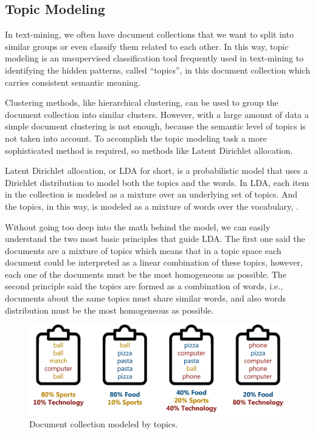 	\subsection{Topic Modeling}
	
	In text-mining, we often have document collections that we want to split into similar groups or even classify them related to each other. In this way, topic modeling is an unsupervised classification tool frequently used in text-mining to identifying the hidden patterns, called ``topics'', in this document collection which carries consistent semantic meaning.
	
	Clustering methods, like hierarchical clustering, can be used to group the document collection into similar clusters. However, with a large amount of data a simple document clustering is not enough, because the semantic level of topics is not taken into account. To accomplish the topic modeling task a more sophisticated method is required, so methods like Latent Dirichlet allocation.
	
	Latent Dirichlet allocation, or LDA for short, is a probabilistic model that uses a Dirichlet distribution to model both the topics and the words. In LDA, each item in the collection is modeled as a mixture over an underlying set of topics. And the topics, in this way, is modeled as a mixture of words over the vocabulary, \cite{blei2003latent}.
		
	Without going too deep into the math behind the model, we can easily understand the two most basic principles that guide LDA. The first one said the documents are a mixture of topics which means that in a topic space each document could be interpreted as a linear combination of these topics, however, each one of the documents must be the most homogeneous as possible. The second principle said the topics are formed as a combination of words, i.e., documents about the same topics must share similar words, and also words distribution must be the most homogeneous as possible.
	
	\begin{figure}[h!]
		\centering
		\includegraphics[width=0.85\linewidth]{01.Chapters/02.Background/topic_modeling}
		\caption{Document collection modeled by topics.}
		\label{fig:topicmodeling}
	\end{figure}
	
